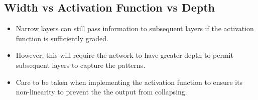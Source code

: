 \subsection{Width vs Activation Function vs Depth}
\begin{itemize}
	\item Narrow layers can still pass information to subsequent layers if the activation function is sufficiently graded.
	\item However, this will require the network to have greater depth to permit subsequent layers to capture the patterns.
	\item Care to be taken when implementing the activation function to ensure its non-linearity to prevent the the output from collapsing.
\end{itemize}












